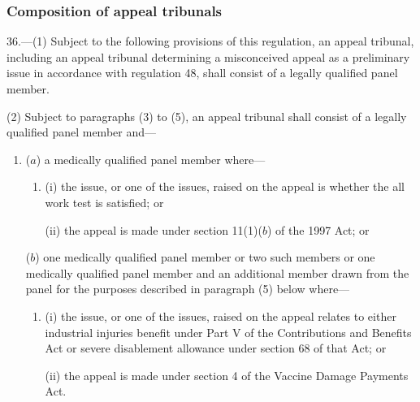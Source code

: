 \documentclass[12pt,a4paper]{article}
\begin{document}
\subsubsection[36. Composition of appeal tribunals]{Composition of appeal tribunals}

36.—(1) Subject to the following provisions of this regulation, an appeal tribunal, including an appeal tribunal determining a misconceived appeal as a preliminary issue in accordance with regulation 48, shall consist of a legally qualified panel member.

%
%
%
%

(2) Subject to paragraphs (3) to (5), an appeal tribunal shall consist of a legally qualified panel member and—
\begin{enumerate}\item[]
($a$) a medically qualified panel member where—
\begin{enumerate}\item[]
(i) the issue, or one of the issues, raised on the appeal is whether the all work test is satisfied; or

(ii) the appeal is made under section 11(1)($b$) of the 1997 Act; or
\end{enumerate}

($b$) one medically qualified panel member or two such members or one medically qualified panel member and an additional member drawn from the panel for the purposes described in paragraph (5) below where—
\begin{enumerate}\item[]
(i) the issue, or one of the issues, raised on the appeal relates to either industrial injuries benefit under Part V of the Contributions and Benefits Act or severe disablement allowance under section 68 of that Act; or

(ii) the appeal is made under section 4 of the Vaccine Damage Payments Act.
\end{enumerate}
\end{enumerate}
\end{document}
